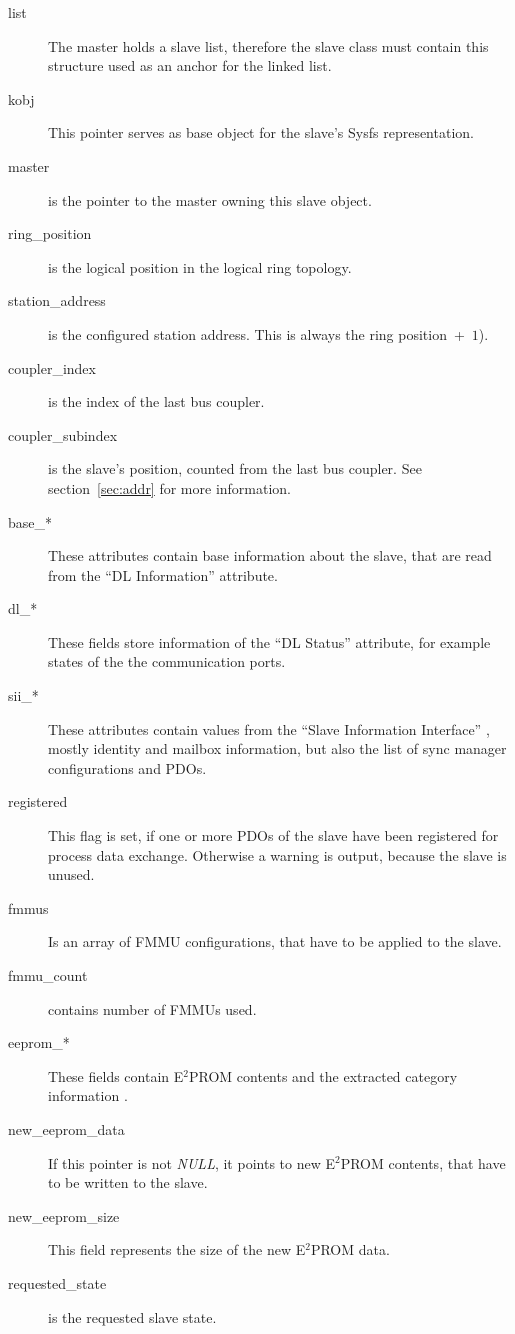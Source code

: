\documentclass[a4paper,12pt,BCOR6mm,bibtotoc,idxtotoc]{scrbook}
\begin{document}
\begin{description}
\item[list] The master holds a slave list, therefore the slave class
  must contain this structure used as an anchor for the linked
  list.
\item[kobj] This pointer serves as base object for the slave's Sysfs
  representation.
\item[master] is the pointer to the master owning this slave object.
\item[ring\_position] is the logical position in the logical ring
  topology.
\item[station\_address] is the configured station address. This is
  always the ring position~+~$1$).
\item[coupler\_index] is the index of the last bus coupler.
\item[coupler\_subindex] is the slave's position, counted from the
  last bus coupler. See section~\ref{sec:addr} for more information.
\item[base\_*] These attributes contain base information about the
  slave, that are read from the ``DL Information'' attribute.
\item[dl\_*] These fields store information of the ``DL Status''
  attribute, for example states of the the communication ports.
\item[sii\_*] These attributes contain values from the ``Slave
  Information Interface'' \cite[section~6.4]{dlspec}, mostly identity
  and mailbox information, but also the list of sync manager
  configurations and PDOs.
\item[registered] This flag is set, if one or more PDOs of the slave
  have been registered for process data exchange. Otherwise a warning
  is output, because the slave is unused.
\item[fmmus] Is an array of FMMU configurations, that have to be
  applied to the slave.
\item[fmmu\_count] contains number of FMMUs used.
\item[eeprom\_*] These fields contain E$^2$PROM contents and the
  extracted category information \cite[section~5.4]{alspec}.
\item[new\_eeprom\_data] If this pointer is not \textit{NULL}, it
  points to new E$^2$PROM contents, that have to be written to the
  slave.
\item[new\_eeprom\_size] This field represents the size of the new
  E$^2$PROM data.
\item[requested\_state] is the requested slave state.

\end{description}
\end{document}
